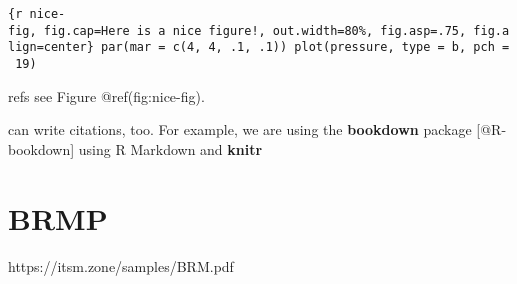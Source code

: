 \texttt{\{r\ nice-fig,\ fig.cap=\textquotesingle{}Here\ is\ a\ nice\ figure!\textquotesingle{},\ out.width=\textquotesingle{}80\%\textquotesingle{},\ fig.asp=.75,\ fig.align=\textquotesingle{}center\textquotesingle{}\}\ par(mar\ =\ c(4,\ 4,\ .1,\ .1))\ plot(pressure,\ type\ =\ \textquotesingle{}b\textquotesingle{},\ pch\ =\ 19)}

refs see Figure @ref(fig:nice-fig).

can write citations, too. For example, we are using the
\textbf{bookdown} package {[}@R-bookdown{]} using R Markdown and
\textbf{knitr}

\hypertarget{brmp}{%
\section{BRMP}\label{brmp}}

https://itsm.zone/samples/BRM.pdf
